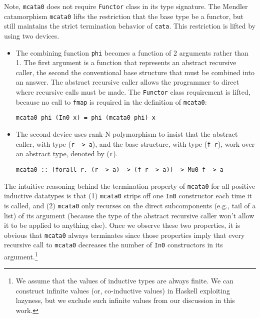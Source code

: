 \documentclass[letterpaper,12pt]{article}
\begin{document}
Note, \verb|mcata0| does not require \verb|Functor| class in its type signature.
The Mendler catamorphism \verb|mcata0| lifts the restriction that the
base type be a functor, but still maintains the strict termination
behavior of \verb|cata|. This restriction is lifted by using two devices.
\begin{itemize}
  \item The combining function \verb|phi| becomes a function of 2 arguments
        rather than 1. The first argument is a function that represents an
        abstract recursive caller, the second the conventional base structure
        that must be combined into an answer. The abstract recursive caller
        allows the programmer to direct where recursive calls must be made.
        The \verb|Functor| class requirement is lifted,
        because no call to \verb|fmap|
        is required in the definition of \verb|mcata0|:
\begin{verbatim}
mcata0 phi (In0 x) = phi (mcata0 phi) x
\end{verbatim}
  \item The second device uses rank-N polymorphism to insist that
        the abstract caller, with type (\verb|r -> a|), and
        the base structure, with type (\verb|f r|),
        work over an abstract type, denoted by (\verb|r|). 
\begin{verbatim}
mcata0 :: (forall r. (r -> a) -> (f r -> a)) -> Mu0 f -> a
\end{verbatim}
\end{itemize}

The intuitive reasoning behind the termination property of \verb|mcata0| for
all positive inductive datatypes is that (1) \verb|mcata0| strips off one \verb|In0|
constructor each time it is called, and (2) \verb|mcata0| only recurses on the
direct subcomponents (e.g., tail of a list) of its argument (because the type
of the abstract recursive caller won't allow it to be applied to anything else).
Once we observe these two properties, it is obvious that \verb|mcata0| always
terminates since those properties imply that every recursive call to \verb|mcata0|
decreases the number of \verb|In0| constructors in its argument.\footnote{We assume
that the values of inductive types are always finite. We can construct infinite
values (or, co-inductive values) in Haskell exploiting lazyness, but we exclude
such infinite values from our discussion in this work.}
\end{document}
